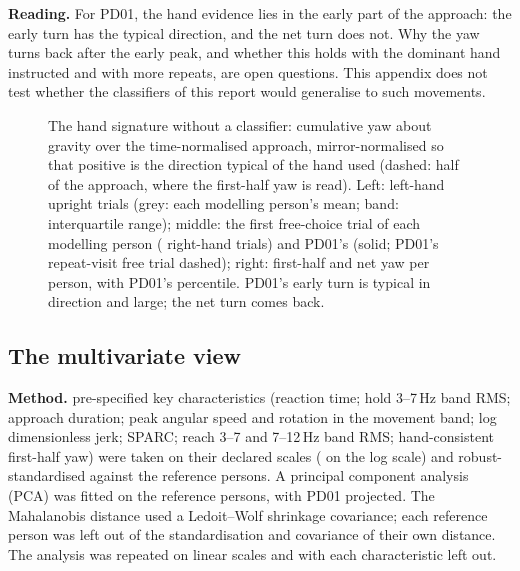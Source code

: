 \textbf{Reading.}
For PD01, the hand evidence lies in the early part of the approach: the early turn has the typical direction, and the net turn does not.
Why the yaw turns back after the early peak, and whether this holds with the dominant hand instructed and with more repeats, are open questions.
This appendix does not test whether the classifiers of this report would generalise to such movements.

\begin{figure}[htbp]
  \centering
  \caption{The hand signature without a classifier: cumulative yaw about gravity over the time-normalised approach, mirror-normalised so that positive is the direction typical of the hand used (dashed: half of the approach, where the first-half yaw is read).
    Left: left-hand upright trials (grey: each modelling person's mean; band: interquartile range); middle: the first free-choice trial of each modelling person ( right-hand trials) and PD01's (solid; PD01's repeat-visit free trial dashed); right: first-half and net yaw per person, with PD01's percentile.
    PD01's early turn is typical in direction and large; the net turn comes back.}
  \label{fig:X1_07_hand_signature}\label{fig:app:pd01-hand}
\end{figure}

\FloatBarrier
\subsection{The multivariate view}\label{app:pd01:multivariate}

\textbf{Method.}
 pre-specified key characteristics (reaction time; hold 3--7\,Hz band RMS; approach duration; peak angular speed and rotation in the movement band; log dimensionless jerk; SPARC; reach 3--7 and 7--12\,Hz band RMS; hand-consistent first-half yaw) were taken on their declared scales ( on the log scale) and robust-standardised against the reference persons.
A principal component analysis (PCA) was fitted on the reference persons, with PD01 projected.
The Mahalanobis distance used a Ledoit--Wolf shrinkage covariance; each reference person was left out of the standardisation and covariance of their own distance.
The analysis was repeated on linear scales and with each characteristic left out.

